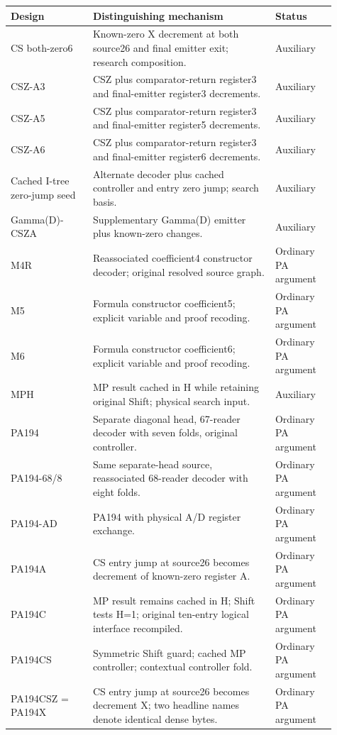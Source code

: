 \begin{longtable}{p{0.23\linewidth}p{0.51\linewidth}p{0.17\linewidth}}
\toprule
Design & Distinguishing mechanism & Status\\
\midrule\endhead
CS both-zero6 & Known-zero X decrement at both source26 and final emitter exit; research composition. & Auxiliary\\
CSZ-A3 & CSZ plus comparator-return register3 and final-emitter register3 decrements. & Auxiliary\\
CSZ-A5 & CSZ plus comparator-return register3 and final-emitter register5 decrements. & Auxiliary\\
CSZ-A6 & CSZ plus comparator-return register3 and final-emitter register6 decrements. & Auxiliary\\
Cached I-tree zero-jump seed & Alternate decoder plus cached controller and entry zero jump; search basis. & Auxiliary\\
Gamma(D)-CSZA & Supplementary Gamma(D) emitter plus known-zero changes. & Auxiliary\\
M4R & Reassociated coefficient4 constructor decoder; original resolved source graph. & Ordinary PA argument\\
M5 & Formula constructor coefficient5; explicit variable and proof recoding. & Ordinary PA argument\\
M6 & Formula constructor coefficient6; explicit variable and proof recoding. & Ordinary PA argument\\
MPH & MP result cached in H while retaining original Shift; physical search input. & Auxiliary\\
PA194 & Separate diagonal head, 67-reader decoder with seven folds, original controller. & Ordinary PA argument\\
PA194-68/8 & Same separate-head source, reassociated 68-reader decoder with eight folds. & Ordinary PA argument\\
PA194-AD & PA194 with physical A/D register exchange. & Ordinary PA argument\\
PA194A & CS entry jump at source26 becomes decrement of known-zero register A. & Ordinary PA argument\\
PA194C & MP result remains cached in H; Shift tests H=1; original ten-entry logical interface recompiled. & Ordinary PA argument\\
PA194CS & Symmetric Shift guard; cached MP controller; contextual controller fold. & Ordinary PA argument\\
PA194CSZ = PA194X & CS entry jump at source26 becomes decrement X; two headline names denote identical dense bytes. & Ordinary PA argument\\

\end{longtable}
